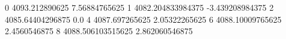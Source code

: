 0 4093.212890625 7.56884765625
1 4082.204833984375 -3.439208984375
2 4085.64404296875 0.0
4 4087.697265625 2.05322265625
6 4088.10009765625 2.4560546875
8 4088.506103515625 2.862060546875
